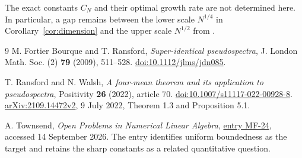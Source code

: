 \documentclass[11pt,a4paper]{article}
\begin{document}
The exact constants $C_N$ and their optimal growth rate are not determined
here. In particular, a gap remains between the lower scale $N^{1/4}$ in
Corollary~\ref{cor:dimension} and the upper scale $N^{1/2}$ from
\cite[Theorem 1.3]{ransford-walsh}.

\begin{thebibliography}{9}
M. Fortier Bourque and T. Ransford,
\emph{Super-identical pseudospectra},
J. London Math. Soc. (2) \textbf{79} (2009), 511--528.
\href{https://doi.org/10.1112/jlms/jdn085}{doi:10.1112/jlms/jdn085}.

T. Ransford and N. Walsh,
\emph{A four-mean theorem and its application to pseudospectra},
Positivity \textbf{26} (2022), article 70.
\href{https://doi.org/10.1007/s11117-022-00928-8}{doi:10.1007/s11117-022-00928-8}.
\href{https://arxiv.org/abs/2109.14472v2}{arXiv:2109.14472v2}, 9 July 2022,
Theorem 1.3 and Proposition 5.1.

A. Townsend, \emph{Open Problems in Numerical Linear Algebra},
\href{https://github.com/ajt60gaibb/OpenProblemsInNLA/tree/main/matrix-functions-and-stability/MF-24}{entry MF-24},
accessed 14 September 2026. The entry identifies uniform boundedness as
the target and retains the sharp constants as a related quantitative question.
\end{thebibliography}
\end{document}
